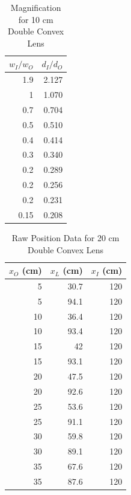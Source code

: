 \begin{table}[ht]
    \centering
    \begin{tabular}{|r|r|}
        \hline
        $w_{I} / w_{O}$ & $d_{I} / d_{O}$ \\
        \hline
        1.9 & 2.127 \\
        1 & 1.070 \\
        0.7 & 0.704 \\
        0.5 & 0.510 \\
        0.4 & 0.414 \\
        0.3 & 0.340 \\
        0.2 & 0.289 \\
        0.2 & 0.256 \\
        0.2 & 0.231 \\
        0.15 & 0.208 \\
        \hline
    \end{tabular}
    \caption{Magnification for 10 cm Double Convex Lens}
    \label{table.08.magnification.10cm}
\end{table}
%
\begin{table}[ht!]
    \centering
    \begin{tabular}{|r|r|r|}
        \hline
        $x_{O}$ (cm) & $x_{L}$ (cm) & $x_{I}$ (cm) \\
        \hline
        5 & 30.7 & 120 \\
        5 & 94.1 & 120 \\
        10 & 36.4 & 120 \\
        10 & 93.4 & 120 \\
        15 & 42 & 120 \\
        15 & 93.1 & 120 \\
        20 & 47.5 & 120 \\
        20 & 92.6 & 120 \\
        25 & 53.6 & 120 \\
        25 & 91.1 & 120 \\
        30 & 59.8 & 120 \\
        30 & 89.1 & 120 \\
        35 & 67.6 & 120 \\
        35 & 87.6 & 120 \\
        \hline
        \end{tabular}
    \caption{Raw Position Data for 20 cm Double Convex Lens}
    \label{table.08.position.20cm}
\end{table}
%
